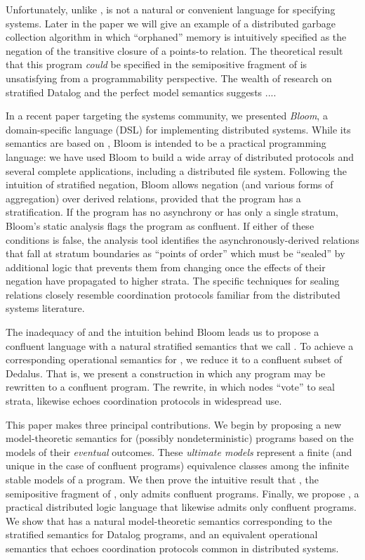 Unfortunately, unlike \lang, \slang is not a natural or convenient language for specifying systems.  Later in the paper we will give 
an example of a distributed garbage collection algorithm in which ``orphaned'' memory is intuitively specified as the negation of the transitive 
closure of a points-to relation.  The theoretical result that this program \emph{could} be specified in the semipositive fragment
of \lang is unsatisfying from a programmability perspective.  The wealth of research on stratified Datalog and the perfect model semantics
suggests ....

In a recent paper targeting the systems community, we presented \emph{Bloom}, a domain-specific language (DSL) for implementing distributed 
systems.  While its semantics are based on \lang, Bloom is intended to be a practical programming language: we have used
Bloom to build a wide array of distributed protocols and several complete
applications, including a distributed file system.
Following the intuition of stratified negation, Bloom allows negation (and various forms of aggregation) over derived relations, provided
that the program has a stratification.  If the program has no asynchrony or has only a single stratum, Bloom's static analysis flags the 
program as confluent.  If either of these conditions is false, the analysis tool identifies the asynchronously-derived relations that fall 
at stratum boundaries as ``points of order'' which must be ``sealed'' by additional logic that prevents them from changing once the effects 
of their negation have propagated to higher strata.  The specific techniques for sealing relations closely resemble coordination protocols
familiar from the distributed systems literature.

The inadequacy of \slang and the intuition behind Bloom leads us to propose a confluent language with a natural stratified semantics that we
call \plang.  To achieve a corresponding operational semantics for \plang, we reduce it to a confluent subset of Dedalus.  
That is, we present a construction in which any \plang program may be rewritten to a confluent \lang program.  The rewrite, in which nodes ``vote''
to seal strata, likewise echoes coordination protocols in widespread use.

This paper makes three principal contributions.  We begin by proposing a new model-theoretic semantics for (possibly nondeterministic) \dedalus 
programs based on the models of their \emph{eventual} outcomes.  These \emph{ultimate models} represent a finite (and unique in the case of confluent 
programs) equivalence classes among the infinite stable models of a \lang program.  We then prove the intuitive result that \slang, the semipositive fragment of \lang, only admits confluent programs.  Finally, we propose \plang, a practical distributed logic language that likewise admits only confluent programs.
We show that \plang has a natural model-theoretic semantics corresponding to the stratified semantics for Datalog programs, and an equivalent
operational semantics that echoes coordination protocols common in distributed systems.
